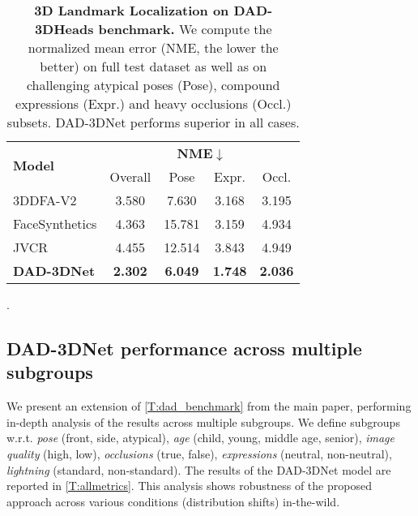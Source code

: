 \documentclass[10pt,twocolumn,letterpaper]{article}
\begin{document}
\begin{table}[t]
\footnotesize
\centering


    \begin{tabular}{@{}l|cccc@{}}
    \toprule \multirow{2}{*}{\textbf{Model}}& 
        \multicolumn{4}{c}{\textbf{NME}{$\downarrow$}}\\
                 & {Overall}  &  {Pose}  &  {Expr.}  &  {Occl.} \\\toprule 3DDFA-V2 \cite{guo2020towards}  & 3.580  &  7.630  &  3.168  &  3.195  \\
        FaceSynthetics \cite{wood2021fake}  & 4.363  &  15.781  &  3.159  &  	4.934  \\
        JVCR \cite{jvcr}  & 4.455  &  12.514  &  3.843  &  4.949  \\

        \textbf{DAD-3DNet}
                 & \textbf{2.302}  &  \textbf{6.049}  &  \textbf{1.748}  &  \textbf{2.036}  \\\bottomrule
    \end{tabular}
\caption{\textbf{3D Landmark Localization on DAD-3DHeads benchmark.} We compute the normalized mean error (NME, the lower the better) on full test dataset as well as on challenging atypical poses (Pose), compound expressions (Expr.) and heavy occlusions (Occl.) subsets. DAD-3DNet performs superior in all cases.}.
\label{t:3d_landarks_dad}
\end{table}


 

\subsection{DAD-3DNet performance across multiple subgroups}\label{ssec:distribution_shifts}
We present an extension of \cref{T:dad_benchmark} from the main paper, performing in-depth analysis of the results across multiple subgroups. We define subgroups w.r.t. \emph{pose} (front, side, atypical), \emph{age} (child, young, middle age, senior), \emph{image quality} (high, low), \emph{occlusions} (true, false), \emph{expressions} (neutral, non-neutral), \emph{lightning} (standard, non-standard). The results of the DAD-3DNet model are reported in \cref{T:allmetrics}. This analysis shows robustness of the proposed approach across various conditions (distribution shifts) in-the-wild.
\end{document}
